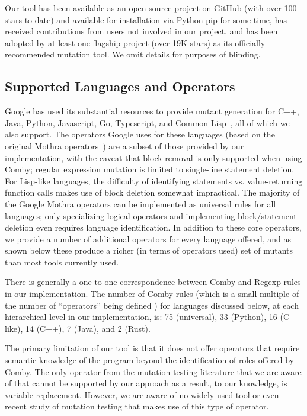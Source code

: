 \documentclass[acmsmall,screen,review,anonymous]{acmart}
\begin{document}
{Our tool has been available as an open source project on GitHub (with
over 100 stars to date) and
available for installation via Python pip for
some time, has received contributions from users not involved in
our project, and has been adopted by at least one flagship project
(over 19K stars) as
its officially recommended mutation tool.  We omit details for
purposes of blinding.

\subsection{Supported Languages and Operators}

Google has used its substantial resources to provide mutant generation for C++, Java,
Python, Javascript, Go, Typescript, and Common
Lisp~\cite{PetrovicMutationGoogle}, all of which we also support.  The
operators Google uses for these
languages (based on the original Mothra operators~\cite{offutt1996experimental}) are a subset of those provided by our implementation, with the caveat
that block removal is only supported when using Comby;
regular expression mutation is limited to single-line statement
deletion.  For Lisp-like languages, the difficulty of identifying statements vs. value-returning
function calls makes use of block deletion somewhat impractical.  The majority of the Google Mothra operators
can be implemented as universal rules for all languages; only specializing
logical operators and implementing block/statement deletion even requires
language identification.  In addition to these core operators, we
provide a number of additional operators for every language offered,
and as shown below these produce a richer (in terms of operators used) set of mutants than most
tools currently used.

There is generally a one-to-one
correspondence between Comby and Regexp rules in our implementation.
The number of Comby rules (which is a small multiple of the number of
``operators'' being defined ) for languages discussed below, at each hierarchical level in our
implementation, is:  75 (universal), 33 (Python), 16 (C-like), 14
(C++), 7 (Java), and 2 (Rust).

The primary limitation of our tool is that it does not offer operators
that require semantic knowledge of the program beyond the
identification of roles offered by Comby.
The only operator from the mutation testing literature that we are aware of that
cannot be supported by our approach as a result, to our knowledge, is variable
replacement.  However, we are aware of no widely-used tool or even recent
study of mutation testing that makes use of this type of operator.


}
\end{document}
